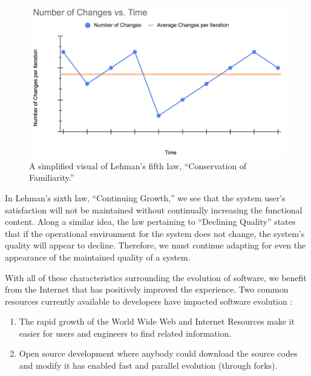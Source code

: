 \documentclass[12pt,conference]{IEEEtran}
\begin{document}
\begin{figure}[ht]
    \centerline{
        \includegraphics[width=\columnwidth]{Changes-vs-Time}
    }
    \caption{A simplified visual of Lehman's fifth law, ``Conservation of Familiarity.''}
    \label{figConservationOfFamiliarity}
\end{figure}

In Lehman's sixth law, ``Continuing Growth,'' we see that the system user's satisfaction will not be maintained without continually increasing the functional content. Along a similar idea, the law pertaining to ``Declining Quality'' states that if the operational environment for the system does not change, the system's quality will appear to decline. Therefore, we must continue adapting for even the appearance of the maintained quality of a system.

With all of these characteristics surrounding the evolution of software, we benefit from the Internet that has positively improved the experience. Two common resources currently available to developers have impacted software evolution \cite{wiki:software-evolution}:

\vspace{0.25cm}

\begin{enumerate}
    \item The rapid growth of the World Wide Web and Internet Resources make it easier for users and engineers to find related information.
    \item Open source development where anybody could download the source codes and modify it has enabled fast and parallel evolution (through forks).
\end{enumerate}

\vspace{0.25cm}
\end{document}
